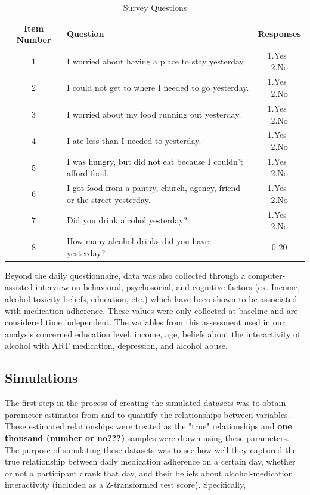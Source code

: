 \documentclass{svjour3}\usepackage[]{graphicx}\usepackage[]{color}
\begin{document}
\begin{table}[H]
	\centering
	\caption{Survey Questions}
	\label{tab:survey_qs}
	\begin{tabular}{cp{6.5cm}c}
		\toprule
		Item Number & Question & Responses\\
		\midrule
		1 & I worried about having a place to stay yesterday. & 1.Yes $\>$ 2.No \\
		2 & I could not get to where I needed to go yesterday. & 1.Yes $\>$ 2.No \\
		3 & I worried about my food running out yesterday. & 1.Yes $\>$ 2.No \\
		4 & I ate less than I needed to yesterday. & 1.Yes $\>$ 2.No \\
		5 & I was hungry, but did not eat because I couldn't afford food. & 1.Yes $\>$ 2.No \\
		6 & I got food from a pantry, church, agency, friend or the street yesterday. & 1.Yes $\>$ 2.No \\
		7 & Did you drink alcohol yesterday? & 1.Yes $\>$ 2.No \\
		8 & How many alcohol drinks did you have yesterday? & 0-20 \\
		\bottomrule
	\end{tabular}
\end{table}

Beyond the daily questionnaire, data was also collected through a computer-assisted interview on behavioral, psychosocial, and cognitive factors (ex. Income, alcohol-toxicity beliefs, education, etc.) which have been shown to be associated with medication adherence. These values were only collected at baseline and are considered time independent. The variables from this assessment used in our analysis concerned education level, income, age, beliefs about the interactivity of alcohol with ART medication, depression, and alcohol abuse. \par

\subsection{Simulations}
\label{sec:2.2}
The first step in the process of creating the simulated datasets was to obtain parameter estimates from \citet{pellowski2016alcohol} and to quantify the relationships between variables. These estimated relationships were treated as the "true" relationships and \textbf{one thousand (number or no???)} samples were drawn using these parameters. The purpose of simulating these datasets was to see how well they captured the true relationship between daily medication adherence on a certain day, whether or not a participant drank that day, and their beliefs about alcohol-medication interactivity (included as a Z-transformed test score). Specifically, \\
\end{document}
